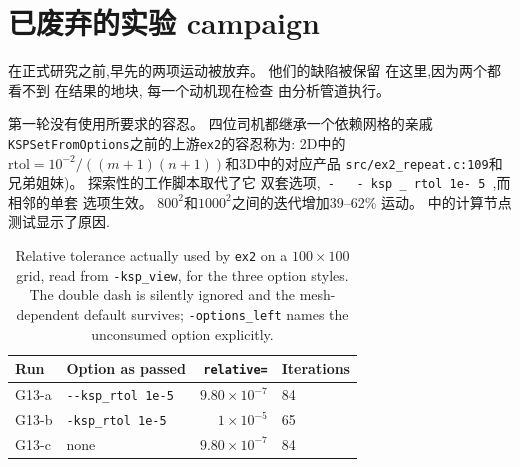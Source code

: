 \documentclass[11pt,a4paper,oneside]{report}
\begin{document}
\section{已废弃的实验 campaign}
\label{sec:superseded}
在正式研究之前,早先的两项运动被放弃。 他们的缺陷被保留
在这里,因为两个都看不到 在结果的地块, 每一个动机现在检查
由分析管道执行。

第一轮没有使用所要求的容忍。 四位司机都继承一个依赖网格的亲戚
\texttt{KSPSetFromOptions}之前的上游\texttt{ex2}的容忍称为:
2D中的$\text{rtol} = 10^{-2}/((m+1)(n+1))$和3D中的对应产品
\texttt{src/ex2\_repeat.c:109}和兄弟姐妹)。 探索性的工作脚本取代了它
双套选项,\texttt { - { } - ksp \_ rtol 1e- 5 },而相邻的单套
选项生效。 $800^2$和$1000^2$之间的迭代增加39--62\%
运动。 中的计算节点测试显示了原因.

\begin{table}[htbp]
  \centering
  \caption{Relative tolerance actually used by \texttt{ex2} on a $100\times100$ grid, read
  from \texttt{-ksp\_view}, for the three option styles. The double dash is silently
  ignored and the mesh-dependent default survives; \texttt{-options\_left} names the
  unconsumed option explicitly.}
  \label{tab:rtol}
  \begin{tabular}{llrl}
    \toprule
    Run & Option as passed & \texttt{relative=} & Iterations \\
    \midrule
    G13-a & \texttt{-{}-ksp\_rtol 1e-5} & $9.80\times10^{-7}$ & 84 \\
    G13-b & \texttt{-ksp\_rtol 1e-5}    & $1\times10^{-5}$    & 65 \\
    G13-c & none                        & $9.80\times10^{-7}$ & 84 \\
    \bottomrule
  \end{tabular}
\end{table}
\end{document}
